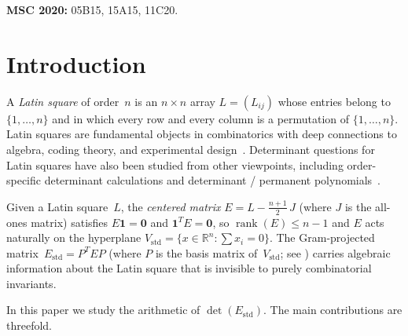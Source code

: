 \documentclass[11pt,a4paper]{article}
\newcommand{\one}{\mathbf{1}}
\newcommand{\rank}{\operatorname{rank}}
\newcommand{\Estd}{E_{\mathrm{std}}}
\newcommand{\Vstd}{V_{\mathrm{std}}}
\begin{document}
\medskip
\noindent
\textbf{MSC 2020:} 05B15, 15A15, 11C20.

\section{Introduction}\label{sec:intro}

A \emph{Latin square} of order~$n$ is an $n\times n$ array $L=(L_{ij})$
whose entries belong to $\{1,\dots,n\}$ and in which every row and every
column is a permutation of $\{1,\dots,n\}$.  Latin squares are
fundamental objects in combinatorics with deep connections to algebra,
coding theory, and experimental design~\cite{DK91,Wanless11}.  Determinant
questions for Latin squares have also been studied from other viewpoints,
including order-specific determinant calculations and determinant /
permanent polynomials~\cite{FordJohnson96,DJW16}.

Given a Latin square~$L$, the \emph{centered matrix}
$E = L - \tfrac{n+1}{2}\,J$ (where $J$ is the all-ones matrix) satisfies
$E\one=\mathbf{0}$ and $\one^T E=\mathbf{0}$, so $\rank(E)\le n-1$ and
$E$ acts naturally on the hyperplane
$\Vstd=\{x\in\mathbb{R}^n:\sum x_i=0\}$.  The Gram-projected
matrix~$\Estd = P^TEP$ (where $P$ is the basis matrix of~$\Vstd$;
see ) carries algebraic information about
the Latin square that is invisible to purely combinatorial invariants.

In this paper we study the arithmetic of $\det(\Estd)$.  The main
contributions are threefold.
\end{document}
